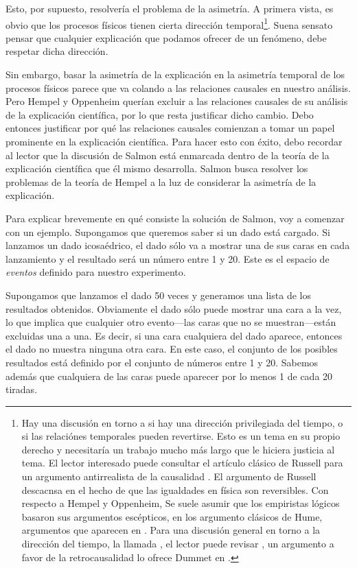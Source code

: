 Esto, por supuesto, resolvería el problema de la asimetría.
A primera vista, es obvio que los procesos físicos tienen
cierta dirección temporal\footnote{
	Hay	una discusión en torno a si hay una dirección privilegiada del
	tiempo, o si las relaciónes temporales pueden revertirse. Esto es un
	tema en su propio derecho y necesitaría un trabajo mucho más largo
	que le hiciera justicia al tema. El lector interesado puede consultar
	el artículo clásico de Russell para un argumento antirrealista de la
	causalidad \parencite{ onthecauserussell }. El argumento
	de Russell descacnsa en el hecho de que las igualdades en
	física son reversibles. Con respecto a Hempel y Oppenheim,
	Se suele asumir que los empiristas lógicos basaron sus
	argumentos escépticos, en los argumento clásicos de Hume,
	argumentos que aparecen en	\parencite{ hume1784 }. Para
	una discusión general en torno a la	dirección del tiempo,
	la llamada , el lector	puede
	revisar \parencite{ utmArrowTime }, un argumento a favor de la
	retrocausalidad lo ofrece Dummet en \parencite{ dummetcause }.
}.
Suena sensato pensar que cualquier explicación que podamos ofrecer de un
fenómeno, debe respetar dicha dirección.

Sin embargo, basar la asimetría de la explicación en la asimetría
temporal de los procesos físicos parece que va colando a las
relaciones causales en nuestro análisis. Pero Hempel y Oppenheim
querían excluir a las relaciones causales de su análisis de la
explicación científica, por lo que resta justificar dicho cambio.
Debo entonces justificar por qué las relaciones causales comienzan a
tomar un papel prominente en la explicación científica. Para hacer
esto con éxito, debo recordar al lector que la discusión de Salmon
está enmarcada dentro de la teoría de la explicación científica que
él mismo desarrolla. Salmon busca resolver los problemas de la teoría
de Hempel a la luz de considerar la asimetría de la explicación.

Para explicar brevemente en qué consiste la solución de Salmon, voy a
comenzar con un ejemplo. Supongamos que queremos saber si un dado
está cargado. Si lanzamos un dado icosaédrico, el dado sólo va a
mostrar una de sus caras en cada lanzamiento y el resultado será un
número entre 1 y 20. Este es el espacio de \emph{eventos} definido
para nuestro experimento.

Supongamos que lanzamos el dado 50 veces y generamos una lista de los
resultados obtenidos. Obviamente el dado sólo puede mostrar una cara
a la vez, lo que implica que cualquier otro evento---las caras que
no se muestran---están excluidas una a una. Es decir, si una cara
cualquiera del dado aparece, entonces el dado no muestra ninguna otra
cara. En este caso, el conjunto de los posibles resultados está
definido por el conjunto de números entre 1 y 20. Sabemos además que
cualquiera de las caras puede aparecer por lo menos 1 de cada 20
tiradas.

